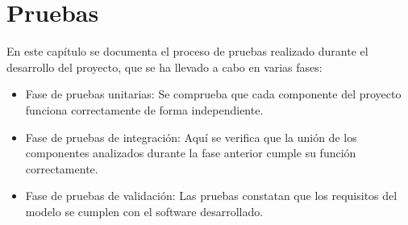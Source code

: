 

\chapter{Pruebas}
\thispagestyle{chapterpage}

En este capítulo se documenta el proceso de pruebas realizado durante el desarrollo del proyecto, que 
se ha llevado a cabo en varias fases:

\begin{itemize}
    \item Fase de pruebas unitarias: Se comprueba que cada componente del proyecto funciona correctamente 
    de forma independiente.
    \item Fase de pruebas de integración: Aquí se verifica que la unión de los componentes analizados 
    durante la fase anterior cumple su función correctamente.
    \item Fase de pruebas de validación: Las pruebas constatan que los requisitos del modelo se cumplen 
    con el software desarrollado.
\end{itemize}









